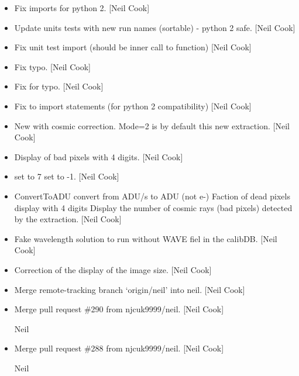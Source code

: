\documentclass[a4paper,10pt,english]{report}
\begin{document}
\begin{itemize}
\item {} 
Fix imports for python 2. {[}Neil Cook{]}

\item {} 
Update units tests with new run names (sortable) - python 2 safe.
{[}Neil Cook{]}

\item {} 
Fix unit test import (should be inner call to function) {[}Neil Cook{]}

\item {} 
Fix typo. {[}Neil Cook{]}

\item {} 
Fix for typo. {[}Neil Cook{]}

\item {} 
Fix to import statements (for python 2 compatibility) {[}Neil Cook{]}

\item {} 
New  with cosmic correction. Mode=2 is by
default this new extraction. {[}Neil Cook{]}

\item {} 
Display of bad pixels with 4 digits. {[}Neil Cook{]}

\item {} 
 set to 7  set to -1. {[}Neil Cook{]}

\item {} 
ConvertToADU convert from ADU/s to ADU (not e-) Faction of dead pixels
display with 4 digits Display the number of cosmic rays (bad pixels)
detected by the extraction. {[}Neil Cook{]}

\item {} 
Fake wavelength solution to run without WAVE fiel in the calibDB.
{[}Neil Cook{]}

\item {} 
Correction of the display of the image size. {[}Neil Cook{]}

\item {} 
Merge remote-tracking branch ‘origin/neil’ into neil. {[}Neil Cook{]}

\item {} 
Merge pull request \#290 from njcuk9999/neil. {[}Neil Cook{]}

Neil

\item {} 
Merge pull request \#288 from njcuk9999/neil. {[}Neil Cook{]}

Neil

\end{itemize}
\end{document}
